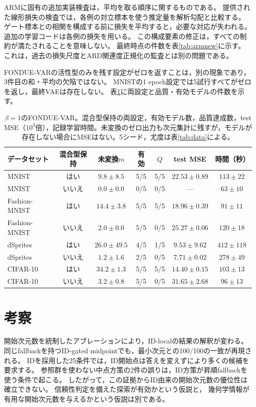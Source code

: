 \documentclass[11pt,a4paper]{ltjsarticle}
\begin{document}
ARMに固有の追加実装検査は，平均を取る順序に関するものである。
提供された線形損失の検査では，各例の対立標本を使う推定量を解析勾配と比較する。
ゲート標本との相関を構成する前に損失を平均すると，必要な対応が失われる。
追加の学習コードは各例の損失を用いる。
この構成要素の修正は，すべての制約が満たされることを意味しない。
最終時点の件数を表\ref{tab:armnew}に示す。
これは，過去の損失尺度とARD関連度正規化の監査とは別の問題である。

FONDUE-VARの活性型のみを残す設定がゼロを返すことは，別の現象であり，3件目の和・平均の欠陥ではない。
MNISTの1 epoch設定では5試行すべてがゼロを返し，最終VAEは存在しない。
表\ref{tab:var}に両設定と品質・有効モデルの件数を示す。

\begin{table}[H]
\caption{$\beta=1$のFONDUE-VAR。混合型保持の両設定，有効モデル数，品質達成数，test MSE（$10^3$倍），記録学習時間。未変換のゼロ出力も次元集計に残すが，モデルが存在しない場合にMSEはない。5シード，尤度は表\ref{tab:data}による。}\label{tab:var}
\footnotesize
\setlength{\tabcolsep}{3.5pt}
\begin{tabular*}{\textwidth}{@{\extracolsep{\fill}}lcccccc@{}}
\toprule
データセット & 混合型保持 & 未変換$m$ & 有効 & $Q$ & test MSE & 時間（秒） \\
\midrule
MNIST & はい & $9.8 \pm 8.5$ & 5/5 & 5/5 & $22.53 \pm 0.89$ & $113 \pm 22$ \\
MNIST & いいえ & $0.0 \pm 0.0$ & 0/5 & 0/5 & --- & $63 \pm 10$ \\
Fashion-MNIST & はい & $14.4 \pm 3.8$ & 5/5 & 5/5 & $18.96 \pm 0.39$ & $91 \pm 11$ \\
Fashion-MNIST & いいえ & $2.0 \pm 0.0$ & 5/5 & 0/5 & $25.27 \pm 0.06$ & $120 \pm 18$ \\
dSprites & はい & $26.0 \pm 49.5$ & 4/5 & 1/5 & $9.53 \pm 9.62$ & $412 \pm 118$ \\
dSprites & いいえ & $1.2 \pm 1.6$ & 2/5 & 0/5 & $7.71 \pm 0.02$ & $278 \pm 49$ \\
CIFAR-10 & はい & $34.2 \pm 1.3$ & 5/5 & 5/5 & $14.40 \pm 0.15$ & $103 \pm 13$ \\
CIFAR-10 & いいえ & $3.2 \pm 0.8$ & 5/5 & 0/5 & $31.65 \pm 2.68$ & $96 \pm 13$ \\
\bottomrule
\end{tabular*}
\end{table}

\section{考察}\label{sec:discussion}
開始次元数を統制したアブレーションにより，ID-localの結果の解釈が変わる。
同じfallbackを持つID-gated midpointでも，最小次元との100/100の一致が再現される。
IDを採用した25条件では，ID開始点は答えを変えずにより多くの候補を要求する。
参照群を使わない中点方策の2件の誤りは，ID方策が昇順fallbackを使う条件で起こる。
したがって，この証拠からID由来の開始次元数の優位性は確立できない。
信頼性判定を備えた探索が有効かという仮説と，
幾何学情報が有用な開始次元数を与えるかという仮説は別である。
\end{document}
